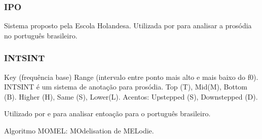 \subsubsection{IPO}
Sistema proposto pela Escola Holandesa. Utilizada por \cite{ipo} para analisar a
prosódia no português brasileiro.
\subsubsection{INTSINT}
Key (frequência base)
Range (intervalo entre ponto mais alto e mais baixo do f0).
INTSINT é um sistema de anotação para prosódia. Top (T), Mid(M), Bottom (B).
Higher (H), Same (S), Lower(L). Acentos: Upstepped (S), Downstepped (D).

Utilizado por \cite{intsintpt} e \cite{moraes1998}para analisar entoação para o
português brasileiro.

Algoritmo MOMEL: MOdelisation de MELodie.
